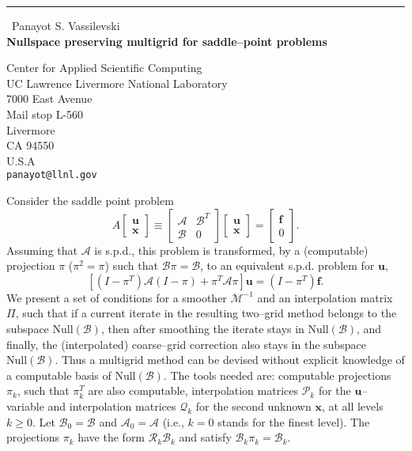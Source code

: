 \documentclass{report}
\begin{document}
\begin{center}
\rule{6in}{1pt} \
{\large Panayot S. Vassilevski \\
{\bf Nullspace preserving multigrid for saddle--point problems}}

Center for Applied Scientific Computing \\ UC Lawrence Livermore National Laboratory \\ 7000 East Avenue \\ Mail stop L-560 \\ Livermore \\ CA 94550 \\ U.S.A
\\
{\tt panayot@llnl.gov}\end{center}

Consider the saddle point problem
$$
A \left [
\begin{array}{c}
{\mathbf u}\\
{\mathbf x}
\end{array} \right ] \equiv
\left [
\begin{array}{cc}
{\mathcal A} & {\mathcal B}^T\\
{\mathcal B} & 0
\end{array} \right ] \left [
\begin{array}{c}
{\mathbf u}\\
{\mathbf x}
\end{array} \right ] = \left [
\begin{array}{c}
{\mathbf f}\\
0
\end{array} \right ].
$$
Assuming that ${\mathcal A}$ is s.p.d.,
this problem is transformed, by a (computable) projection $\pi$ ($\pi^2
= \pi$)
such that
${\mathcal B}\pi = {\mathcal B}$,
to an equivalent
s.p.d. problem for ${\mathbf u}$,
$$
\left [
(I-\pi^T){\mathcal A}(I-\pi) + \pi^T {\mathcal A} \pi \right ]
{\mathbf u} = (I-\pi^T){\mathbf f}.
$$
We present a set of conditions for a smoother
${\mathcal M}^{-1}$ and an interpolation matrix $\Pi$, such that
if a current iterate in the resulting two--grid method
belongs to the subspace $\text{Null}({\mathcal B})$,
then after smoothing
the iterate stays
in $\text{Null}({\mathcal B})$,
and finally,
the (interpolated) coarse--grid correction also stays in the subspace
$\text{Null}({\mathcal B})$.
Thus a multigrid method can be devised without
explicit knowledge of a computable basis
of $\text{Null}({\mathcal B})$.
The tools needed are: computable projections $\pi_k$, such that
$\pi^T_k$ are also
computable, interpolation matrices ${\mathcal P}_k$ for the
${\mathbf u}$--variable and interpolation matrices ${\mathcal Q}_k$ for
the
second unknown ${\mathbf x}$, at all levels $k \ge 0$.
Let ${\mathcal B}_0 = {\mathcal B}$ and
${\mathcal A}_0 = {\mathcal A}$ (i.e., $k=0$ stands for the finest
level).
The projections $\pi_k$ have the form ${\mathcal R}_k{\mathcal B}_k$
and
satisfy ${\mathcal B}_k \pi_k ={\mathcal B}_k$.
\end{document}
